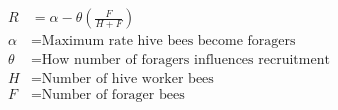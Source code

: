 \documentclass[varwidth=true, border=2pt]{standalone}
\begin{document}
\begin{align*}
R & = \alpha - \theta \left(\frac{F}{H + F}\right) \nonumber \\
\alpha & =  \text{Maximum rate hive bees become foragers} \nonumber \\
\theta & =  \text{How number of foragers influences recruitment} \nonumber \\
H & =  \text{Number of hive worker bees} \nonumber \\
F & =  \text{Number of forager bees} \nonumber \\
\end{align*} 
\end{document}
